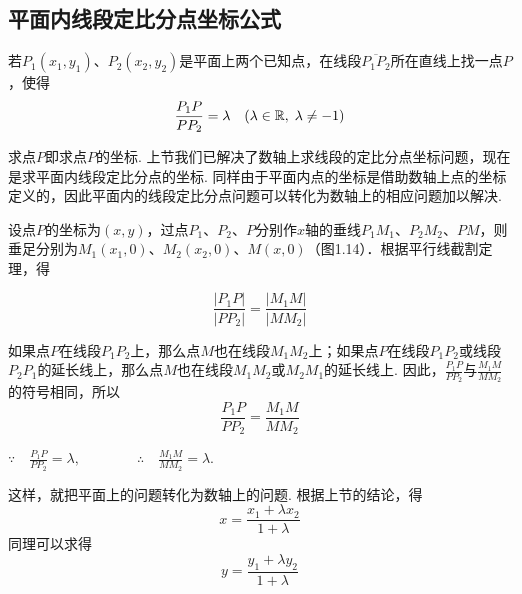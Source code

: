 \subsection{平面内线段定比分点坐标公式}
若$P_1(x_1,y_1)$、$P_2(x_2,y_2)$是平面上两个已知点，在线段$\overline{P_1P_2}$所在直线上找一点$P$，使得
\[\dfrac{P_1P}{PP_2}=\lambda\quad (\lambda\in\mathbb{R},\; \lambda\ne -1)\]
 
\begin{analyze}
    求点$P$即求点$P$的坐标. 上节我们已解决了数轴上求线段的定比分点坐标问题，现在是求平面内线段定比分点的坐标. 同样由于平面内点的坐标是借助数轴上点的坐标定义的，因此平面内的线段定比分点问题可以转化为数轴上的相应问题加以解决.
\end{analyze}

\begin{solution}
设点$P$的坐标为$(x,y)$，过点$P_1$、$P_2$、$P$分别作$x$轴的垂线$P_1M_1$、$P_2M_2$、$PM$，则垂足分别为$M_1(x_1,0)$、$M_2(x_2,0)$、$M(x,0)$（图1.14）．根据平行线截割定理，得

\noindent
\begin{minipage}{.5\textwidth}
\[\frac{|P_1P|}{|PP_2|}=\frac{|M_1M|}{|MM_2|}\]

\CTEXindent 如果点$P$在线段$P_1P_2$上，那么点$M$也在线段$M_1M_2$上；如果点$P$在线段$P_1P_2$或线段$P_2P_1$的延长线上，那么点$M$也在线段$M_1M_2$或$M_2M_1$的延长线上. 因此，$\frac{P_1P}{PP_2}$与$\frac{M_1M}{MM_2}$的符号相同，所以
    \[\frac{P_1P}{PP_2}=\frac{M_1M}{MM_2}\]    
\end{minipage}\hfill
\begin{minipage}{.45\textwidth}
\centering
{}
\end{minipage}

$\because\quad \frac{P_1P}{PP_2}=\lambda, \qquad \qquad \therefore\quad \frac{M_1M}{MM_2}=\lambda$.

这样，就把平面上的问题转化为数轴上的问题. 根据上节的结论，得
\[x=\frac{x_1+\lambda x_2}{1+\lambda}\]
同理可以求得
\[y=\frac{y_1+\lambda y_2}{1+\lambda}\]
\end{solution}

